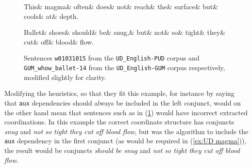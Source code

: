 \begin{figure}
\begin{exe}
	\ex
	\label{ex:UD magma}
	\begin{dependency}[hide label, baseline=-\the\dimexpr\fontdimen22\textfont2\relax]
	\begin{deptext}
	This\& magma\& often\& does\& not\& reach\& the\& surface\& but\& cools\& at\& depth.\\
	\end{deptext}
	\end{dependency}
\end{exe}

\begin{exe}
    \ex
    \label{ex:UD ballet}
    \begin{dependency}[hide label, baseline=-\the\dimexpr\fontdimen22\textfont2\relax]
        \begin{deptext}
            Ballet\& shoes\& should\& be\& snug,\& but\& not\& so\& tight\& they\& cut\& off\& blood\& flow.\\
        \end{deptext}
	\end{dependency}
\end{exe}
\caption{Sentences \texttt{w01031015} from the \texttt{UD\_English-PUD} corpus and \texttt{GUM\_whow\_ballet-14} from the \texttt{UD\_English-GUM} corpus respectively, modified slightly for clarity.}
\end{figure}

Modifying the heuristics, so that they fit this example, for instance by saying that \texttt{aux} dependencies should always be included in the left conjunct, would on the other hand mean that sentences such as in (\ref{ex:UD ballet}) would have incorrect extracted coordinations. In this example the correct coordinate structure has conjuncts \textsl{snug} and \textsl{not so tight they cut off blood flow}, but was the algorithm to include the \texttt{aux} dependency in the first conjunct (as would be required in (\ref{ex:UD magma})), the result would be conjuncts \textsl{should be snug} and \textsl{not so tight they cut off blood flow}.

